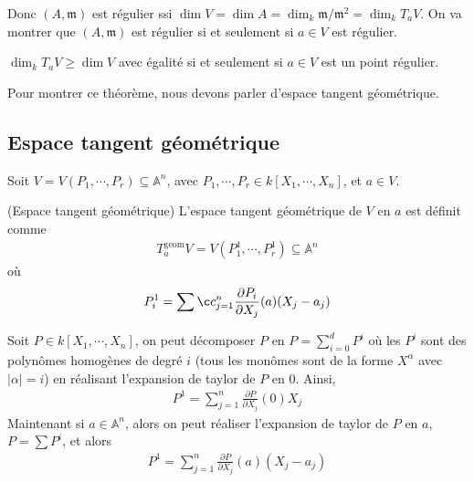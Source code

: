            \begin{theo}
            \end{theo}
            Donc $(A, \mathfrak{m})$ est régulier ssi $\dim V =\dim A = \dim_k \mathfrak{m}/ \mathfrak{m}^2 = \dim_k T_aV$. On va montrer que $(A, \mathfrak{m})$ est régulier si et seulement si $a \in V$ est régulier.
            \begin{theo}
                $\dim_k T_aV \geq \dim V$ avec égalité si et seulement si $a \in V$ est un point régulier.
            \end{theo}
            Pour montrer ce théorème, nous devons parler d'espace tangent géométrique.
        
        \subsection{Espace tangent géométrique}
            Soit $V = V(P_1, \cdots, P_r) \subseteq \mathbb{A}^n$, avec $P_1, \cdots, P_r \in k[X_1, \cdots, X_n]$, et $a \in V$.
            \begin{defi} (Espace tangent géométrique)
                L'espace tangent géométrique de $V$ en $a$ est définit comme
                \begin{align*}
                    T_a^\mathrm{geom} V = V(P^1_1, \cdots, P_r^1) \subseteq \mathbb{A}^n
                \end{align*}
                où 
                \begin{align*}
                    P_i^1 = \sumç_{j = 1}^n \frac{\partial P_i}{\partial X_j}(a) (X_j - a_j)
                \end{align*}
            \end{defi}
            \begin{remq}
                Soit $P \in k[X_1, \cdots, X_n]$, on peut décomposer $P$ en $P = \sum_{i = 0}^d P^i$ où les $P^i$ sont des polynômes homogènes de degré $i$ (tous les monômes sont de la forme $X^\alpha$ avec $|\alpha| = i$) en réalisant l'expansion de taylor de $P$ en $0$. Ainsi, 
                \begin{align*}
                    P^1 = \sum_{j = 1}^n \frac{\partial P}{\partial X_j}(0) X_j
                \end{align*}
                Maintenant si $a \in \mathbb{A}^n$, alors on peut réaliser l'expansion de taylor de $P$ en $a$, $P = \sum P^i$, et alors
                \begin{align*}
                    P^1 = \sum_{j = 1}^n \frac{\partial P}{\partial X_j}(a) (X_j - a_j)
                \end{align*}
            \end{remq}
